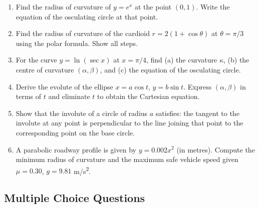 \documentclass[12pt,a4paper]{article}
\begin{document}
\begin{enumerate}[label=\textbf{D\arabic*.}]

\item Find the radius of curvature of $y = e^{x}$ at the point $(0, 1)$. Write the equation of the osculating circle at that point.

\item Find the radius of curvature of the cardioid $r = 2(1 + \cos\theta)$ at $\theta = \pi/3$ using the polar formula. Show all steps.

\item For the curve $y = \ln(\sec x)$ at $x = \pi/4$, find (a) the curvature $\kappa$, (b) the centre of curvature $(\alpha, \beta)$, and (c) the equation of the osculating circle.

\item Derive the evolute of the ellipse $x = a\cos t$, $y = b\sin t$. Express $(\alpha, \beta)$ in terms of $t$ and eliminate $t$ to obtain the Cartesian equation.

\item Show that the involute of a circle of radius $a$ satisfies: the tangent to the involute at any point is perpendicular to the line joining that point to the corresponding point on the base circle.

\item A parabolic roadway profile is given by $y = 0.002x^{2}$ (in metres). Compute the minimum radius of curvature and the maximum safe vehicle speed given $\mu = 0.30$, $g = 9.81$ m/s\textsuperscript{2}.

\end{enumerate}

\subsection*{Multiple Choice Questions}
\end{document}
